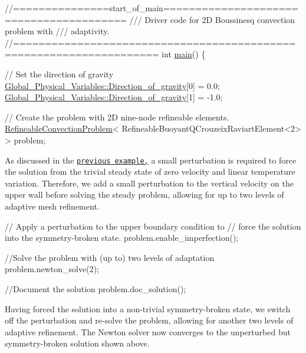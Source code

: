  
\begin{DoxyCodeInclude}
\textcolor{comment}{//===============start\_of\_main========================================}
\textcolor{comment}{/// Driver code for 2D Boussinesq convection problem with }
\textcolor{comment}{}\textcolor{comment}{/// adaptivity.}
\textcolor{comment}{}\textcolor{comment}{//====================================================================}
\textcolor{keywordtype}{int} \hyperlink{boussinesq__convection_8cc_a3c04138a5bfe5d72780bb7e82a18e627}{main}()
\{

 \textcolor{comment}{// Set the direction of gravity}
 \hyperlink{namespaceGlobal__Physical__Variables_a42f4a0aee37dbb36186267931c614053}{Global\_Physical\_Variables::Direction\_of\_gravity}[0] = 0.0;
 \hyperlink{namespaceGlobal__Physical__Variables_a42f4a0aee37dbb36186267931c614053}{Global\_Physical\_Variables::Direction\_of\_gravity}[1] = -1.0;

 \textcolor{comment}{// Create the problem with 2D nine-node refineable elements.}
 \hyperlink{classRefineableConvectionProblem}{RefineableConvectionProblem}<
  RefineableBuoyantQCrouzeixRaviartElement<2> > problem;

\end{DoxyCodeInclude}


As discussed in the \href{../../b_convection/html/index.html}{\tt previous example,} a small perturbation is required to force the solution from the trivial steady state of zero velocity and linear temperature variation. Therefore, we add a small perturbation to the vertical velocity on the upper wall before solving the steady problem, allowing for up to two levels of adaptive mesh refinement.


\begin{DoxyCodeInclude}
 
 \textcolor{comment}{// Apply a perturbation to the upper boundary condition to}
 \textcolor{comment}{// force the solution into the symmetry-broken state.}
 problem.enable\_imperfection();
 
 \textcolor{comment}{//Solve the problem with (up to) two levels of adaptation}
 problem.newton\_solve(2);
 
 \textcolor{comment}{//Document the solution}
 problem.doc\_solution();

\end{DoxyCodeInclude}


Having forced the solution into a non-\/trivial symmetry-\/broken state, we switch off the perturbation and re-\/solve the problem, allowing for another two levels of adaptive refinement. The Newton solver now converges to the unperturbed but symmetry-\/broken solution shown above.


